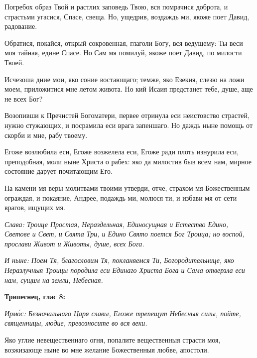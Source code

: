 Погребох образ Твой и растлих заповедь Твою, вся помрачися доброта, и страстьми угасися, Спасе, свеща. Но, ущедрив, воздаждь ми, якоже поет Давид, радование.

Обратися, покайся, открый сокровенная, глаголи Богу, вся ведущему: Ты веси моя тайная, едине Спасе. Но Сам мя помилуй, якоже поет Давид, по милости Твоей.

Исчезоша дние мои, яко соние востающаго; темже, яко Езекия, слезю на ложи моем, приложитися мне летом живота. Но кий Исаия предстанет тебе, душе, аще не всех Бог?


Возопивши к Пречистей Богоматери, первее отринула еси неистовство страстей, нужно стужающих, и посрамила еси врага запеншаго. Но даждь ныне помощь от скорби и мне, рабу твоему.


Егоже возлюбила еси, Егоже возжелела еси, Егоже ради плоть изнурила еси, преподобная, моли ныне Христа о рабех: яко да милостив быв всем нам, мирное состояние дарует почитающим Его.


На камени мя веры молитвами твоими утверди, отче, страхом мя Божественным ограждая, и покаяние, Андрее, подаждь ми, молюся ти, и избави мя от сети врагов, ищущих мя.

\itshape Слава\normalfont{}: Троице Простая, Нераздельная, Единосущная и Естество Едино, Светове и Свет, и Свята Три, и Едино Свято поется Бог Троица; но воспой, прослави Живот и Животы, душе, всех Бога.

\itshape И ныне\normalfont{}: Поем Тя, благословим Тя, покланяемся Ти, Богородительнице, яко Неразлучныя Троицы породила еси Единаго Христа Бога и Сама отверзла еси нам, сущим на земли, Небесная. 

\medskip\bfseries Трипеснец, глас 8:

\normalfont{}


\itshape Ирм\'{о}с\normalfont{}: Безначальнаго Царя славы, Егоже трепещут Небесныя силы, пойте, священницы, людие, превозносите во вся веки.


Яко углие невещественнаго огня, попалите вещественныя страсти моя, возжизающе ныне во мне желание Божественныя любве, апостоли.

